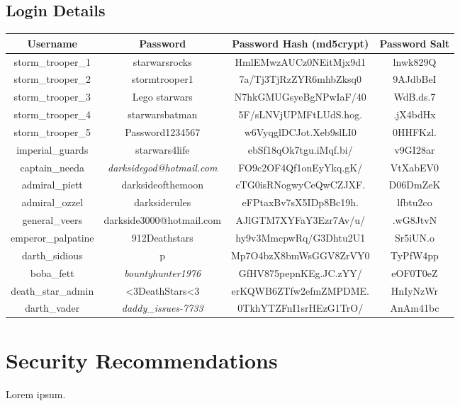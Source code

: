 \documentclass{article}
\begin{document}
\subsection{Login Details}

\begin{adjustwidth}{-1.5cm}{}
\begin{tabular}{ |c|c|c|c| }
\hline
\textbf{Username} & \textbf{Password} & \textbf{Password Hash (md5crypt)} & \textbf{Password Salt} \\
\hline
storm\_trooper\_1 & starwarsrocks & HmlEMwzAUCz0NEitMjx9d1 & lnwk829Q \\
\hline
storm\_trooper\_2 & stormtrooper1 & 7a/Tj3TjRzZYR6mhbZksq0 & 9AJdbBeI \\
\hline
storm\_trooper\_3 & Lego starwars & N7hkGMUGsyeBgNPwIaF/40 & WdB.ds.7 \\
\hline
storm\_trooper\_4 & starwarsbatman & 5F/sLNVjUPMFtLUdS.hog. & .jX4bdHx \\
\hline
storm\_trooper\_5 & Password1234567 & w6VyqglDCJot.Xeb9slLI0 & 0HHFKzl. \\
\hline
imperial\_guards & starwars4life & ebSf18qOk7tgu.iMqf.bi/ & v9GI28ar \\
\hline
captain\_needa & \emph{darksidegod@hotmail.com} & FO9c2OF4Qf1onEyYkq.gK/ & VtXabEV0 \\
\hline
admiral\_piett & darksideofthemoon & cTG0isRNogwyCeQwCZJXF. & D06DmZeK \\
\hline
admiral\_ozzel & darksiderules & eFPtaxBv7sX5IDp8Bc19h. & lfbtu2co \\
\hline
general\_veers & darkside3000@hotmail.com & AJlGTM7XYFaY3Ezr7Av/u/ & .wG8JtvN \\
\hline
emperor\_palpatine & 912Deathstars & hy9v3MmcpwRq/G3Dhtu2U1 & Sr5iUN.o \\
\hline
darth\_sidious & p & Mp7O4bzX8bmWsGGV8ZrVY0 & TyPfW4pp \\
\hline
boba\_fett & \emph{bountyhunter1976} & GfHV875pepnKEg.JC.zYY/ & eOF0T0eZ \\
\hline
death\_star\_admin & \textless 3DeathStars\textless 3 & erKQWB6ZTfw2efmZMPDME. & HnIyNzWr \\
\hline
darth\_vader & \emph{daddy\_issues-7733} & 0TkhYTZFnI1srHEzG1TrO/ & AnAm41bc \\
\hline
\end{tabular}
\end{adjustwidth}

\newpage

\section{Security Recommendations}
\paragraph{}
Lorem ipsum.
\end{document}
